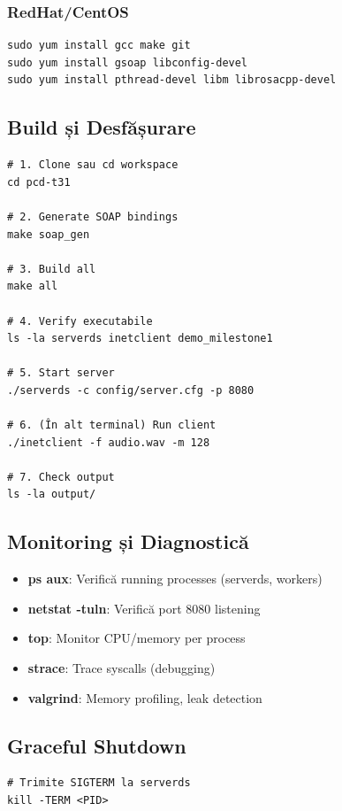 \documentclass[12pt,a4paper,twoside]{article}
\begin{document}
\begin{itemize}
\subsubsection{RedHat/CentOS}
\begin{lstlisting}
sudo yum install gcc make git
sudo yum install gsoap libconfig-devel
sudo yum install pthread-devel libm librosacpp-devel
\end{lstlisting}

\subsection{Build și Desfășurare}

\begin{lstlisting}
# 1. Clone sau cd workspace
cd pcd-t31

# 2. Generate SOAP bindings
make soap_gen

# 3. Build all
make all

# 4. Verify executabile
ls -la serverds inetclient demo_milestone1

# 5. Start server
./serverds -c config/server.cfg -p 8080

# 6. (În alt terminal) Run client
./inetclient -f audio.wav -m 128

# 7. Check output
ls -la output/
\end{lstlisting}

\subsection{Monitoring și Diagnostică}

\begin{itemize}
    \item \textbf{ps aux}: Verifică running processes (serverds, workers)
    \item \textbf{netstat -tuln}: Verifică port 8080 listening
    \item \textbf{top}: Monitor CPU/memory per process
    \item \textbf{strace}: Trace syscalls (debugging)
    \item \textbf{valgrind}: Memory profiling, leak detection
\end{itemize}

\subsection{Graceful Shutdown}

\begin{lstlisting}
# Trimite SIGTERM la serverds
kill -TERM <PID>


\end{lstlisting}
\end{itemize}
\end{document}
